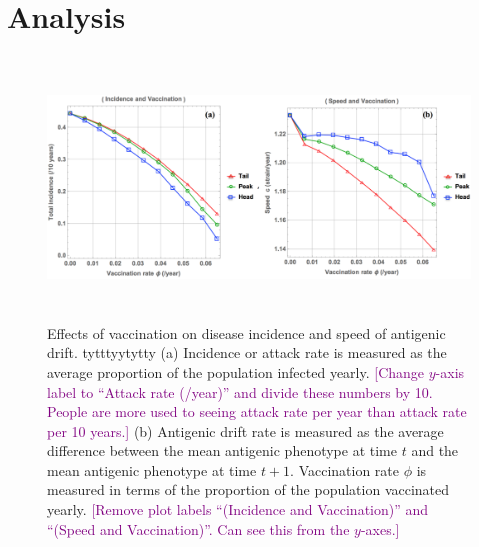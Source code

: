 \documentclass[preprint,12pt]{elsarticle}
\def\tbc#1{\textcolor{purple}{[#1]}}
\begin{document}
\section{Analysis}
\begin{figure}
  \centering
  \includegraphics[width=6in,height=2.75in]{figures/Veffect}
  \caption{Effects of vaccination on disease incidence and speed of antigenic drift. tytttyytytty
  (a) Incidence or attack rate is measured as the average proportion of the population infected yearly.
  \tbc{Change $y$-axis label to ``Attack rate (/year)'' and divide these numbers by 10. People are more used to seeing attack rate per year than attack rate per 10 years.}
  (b) Antigenic drift rate is measured as the average difference between the mean antigenic phenotype at time \(t\) and the mean antigenic phenotype at time \(t+1\).
  Vaccination rate \(\phi\) is measured in terms of the proportion of the population vaccinated yearly.
  \tbc{Remove plot labels ``(Incidence and Vaccination)'' and ``(Speed and Vaccination)''. Can see this from the $y$-axes.}
  }
  \label{fig:Veffect}
\end{figure}
\end{document}
